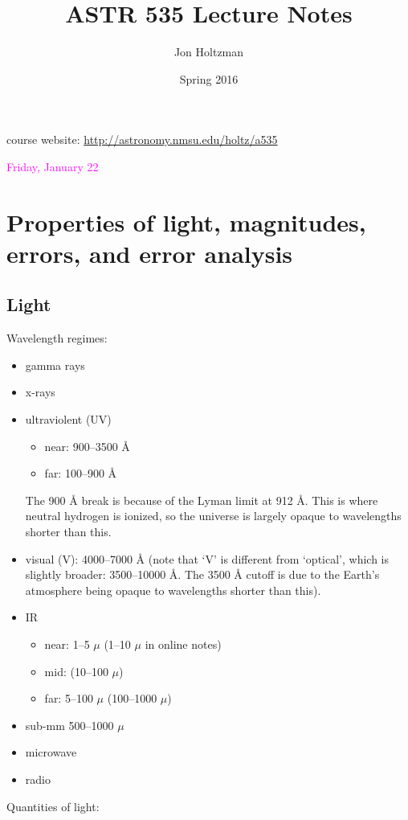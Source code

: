 \documentclass[12pt]{article}
\title{\vspace{-0.75in}ASTR 535 Lecture Notes}
\author{Jon Holtzman}
\date{Spring 2016}
\begin{document}
\maketitle

course website: \textcolor{blue}
{\url{http://astronomy.nmsu.edu/holtz/a535}}

\textcolor{magenta}{Friday, January 22}
\section*{Properties of light, magnitudes, errors, and error analysis}

\subsection*{Light}
Wavelength regimes:
\begin{itemize}
    \item gamma rays
    \item x-rays
    \item ultraviolent (UV)
        \begin{itemize}
            \item near: 900--3500 \AA{}
            \item far: 100--900 \AA{}
        \end{itemize}
        The 900 \AA{} break is because of the Lyman limit at 912 \AA{}.
        This is where neutral hydrogen is ionized, so the universe is largely
        opaque to wavelengths shorter than this.
    \item visual (V): 4000--7000 \AA{}
    (note that `V' is different from `optical',
        which is slightly broader: 3500--10000 \AA{}. The 3500 \AA{} cutoff
        is due to the Earth's atmosphere being opaque to wavelengths shorter
        than this).
    \item IR
        \begin{itemize}
            \item near: 1--5 $\mu$ (1--10 $\mu$ in online notes)
            \item mid: (10--100 $\mu$)
            \item far: 5--100 $\mu$ (100--1000 $\mu$)
        \end{itemize}
    \item sub-mm 500--1000 $\mu$
    \item microwave
    \item radio
\end{itemize}
Quantities of light:
\end{document}
